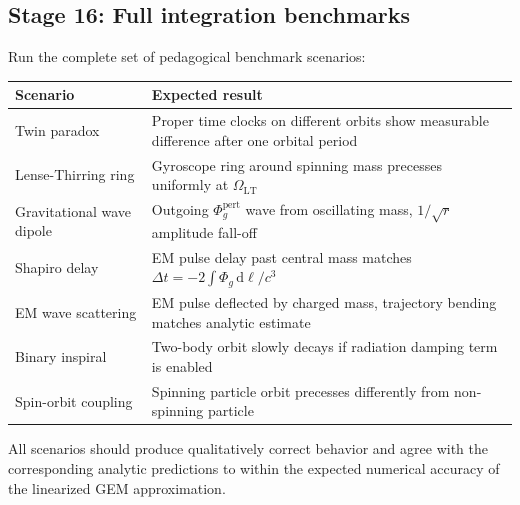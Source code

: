 \documentclass[11pt,a4paper]{article}
\newcommand{\Phig}{\Phi_g}
\newcommand{\dd}{\mathrm{d}}
\begin{document}
\subsection{Stage 16: Full integration benchmarks}

Run the complete set of pedagogical benchmark scenarios:

\begin{center}
\begin{tabular}{@{}L{4.5cm}L{7cm}@{}}
\toprule
\textbf{Scenario} & \textbf{Expected result} \\
\midrule
Twin paradox & Proper time clocks on different orbits show measurable difference after one orbital period \\
Lense-Thirring ring & Gyroscope ring around spinning mass precesses uniformly at $\Omega_{\mathrm{LT}}$ \\
Gravitational wave dipole & Outgoing $\Phig^{\mathrm{pert}}$ wave from oscillating mass, $1/\sqrt{r}$ amplitude fall-off \\
Shapiro delay & EM pulse delay past central mass matches $\Delta t = -2\int\Phig\,\dd\ell/c^3$ \\
EM wave scattering & EM pulse deflected by charged mass, trajectory bending matches analytic estimate \\
Binary inspiral & Two-body orbit slowly decays if radiation damping term is enabled \\
Spin-orbit coupling & Spinning particle orbit precesses differently from non-spinning particle \\
\bottomrule
\end{tabular}
\end{center}

All scenarios should produce qualitatively correct behavior and agree with the corresponding analytic predictions to within the expected numerical accuracy of the linearized GEM approximation.

\end{document}

